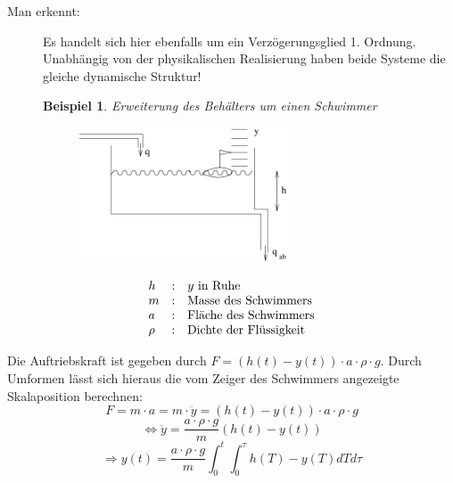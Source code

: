 \documentclass[12pt,a4paper,ngerman]{scrartcl}
\newtheorem{bsp}{Beispiel}[section] %
\begin{document}
\begin{description}
\item[Man erkennt:] Es handelt sich hier ebenfalls um ein Verzögerungsglied 1. Ordnung. Unabhängig von der physikalischen Realisierung haben beide Systeme die gleiche dynamische Struktur!
\end{description}
\begin{figure}[H]
\begin{bsp}
Erweiterung des Behälters um einen Schwimmer
\end{bsp}
\begin{minipage}{.4\linewidth}
\begin{figure}[H]
  \includegraphics[height=4cm]{sysregel_bsp_4}
\end{figure}
\end{minipage}
\begin{minipage}{.6\linewidth}
\begin{align*}
\begin{array}{lll}
h&:& y $ in Ruhe$\\
m&:& $Masse des Schwimmers$\\
a&:& $Fläche des Schwimmers$\\
\rho&:& $Dichte der Flüssigkeit$\\
\end{array}
\end{align*}
\end{minipage}
\end{figure}
Die Auftriebskraft ist gegeben durch $F= (h(t)-y(t))\cdot a \cdot \rho \cdot g$. Durch Umformen lässt sich hieraus die vom Zeiger des Schwimmers angezeigte Skalaposition berechnen:
\begin{equation*}
  F=m \cdot a = m \cdot \ddot{y}=(h(t)-y(t))\cdot a \cdot \rho \cdot g
\end{equation*}
\begin{equation*}
  \Leftrightarrow \ddot{y}= \frac{a \cdot \rho \cdot g}{m}(h(t)-y(t))
\end{equation*}
\begin{equation*}
  \Rightarrow y(t) = \frac{a \cdot \rho \cdot g}{m}\int_0^t{\int_0^\tau{h(T)-y(T)dT}d\tau}
\end{equation*}
\end{document}
